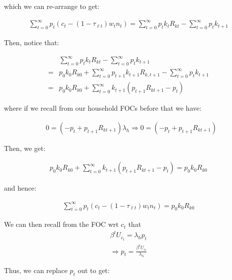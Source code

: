 \documentclass[10pt]{article}
\begin{document}
which we can re-arrange to get:

\begin{align}
    \sum_{t=0}^{\infty} p_t\left(c_t-\left(1-\tau_{\ell t}\right) w_t n_t\right)=\sum_{t=0}^{\infty} p_t k_t R_{k t}-\sum_{t=0}^{\infty} p_t k_{t+1}
\end{align}

Then, notice that:

\begin{align}
        &\sum_{t=0}^{\infty} p_t k_t R_{k t}-\sum_{t=0}^{\infty} p_t k_{t+1} \\
        =&p_0 k_0 R_{k 0} + \sum_{t=0}^{\infty} p_{t+1} k_{t+1} R_{k, t+1} -\sum_{t=0}^{\infty} p_t k_{t+1} \\
        =&p_0 k_0 R_{k 0}+\sum_{t=0}^{\infty} k_{t+1}\left(p_{t+1} R_{k t+1}-p_t\right)
\end{align}

where if we recall from our household FOCs before that we have:

\begin{align}
    &0=\left(-p_t+p_{t+1} R_{k t+1}\right) \lambda_h 
    \Rightarrow0 =\left(-p_t+p_{t+1} R_{k t+1}\right)
\end{align}

Then, we get:

\begin{align}
    p_0 k_0 R_{k 0}+\sum_{t=0}^{\infty} k_{t+1}\left(p_{t+1} R_{k t+1}-p_t\right) =p_0 k_0 R_{k 0}
\end{align}

and hence:

\begin{align}
    \sum_{t=0}^{\infty} p_t\left(c_t-\left(1-\tau_{\ell t}\right) w_t n_t\right)=p_0 k_0 R_{k 0}
\end{align}

We can then recall from the FOC wrt $c_t$ that 
\begin{align}
    \beta^t U_{c_t}=\lambda_h p_t \\
    \Rightarrow p_t = \frac{\beta^t U_{c_t}}{\lambda_h}
\end{align}

Thus, we can replace $p_t$ out to get:
\end{document}
